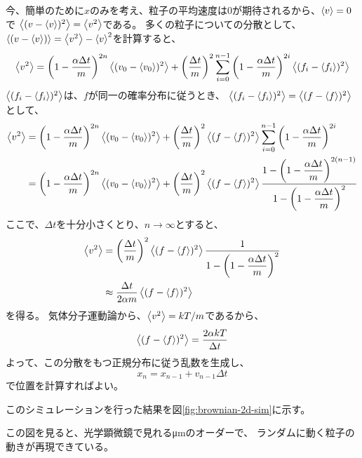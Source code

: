 今、簡単のために$x$のみを考え、粒子の平均速度は0が期待されるから、$\left< v \right> = 0$で
$\left< (v - \left< v \right>)^2 \right> = \left< v^2 \right>$である。
多くの粒子についての分散として、$\left< (v - \left< v \right>) \right> = \left< v^2 \right> - \left< v \right>^2$を計算すると、
\begin{align*}
    \left< v^2 \right> = \left(1 - \dfrac{\alpha \Delta t}{m}\right)^{2n} \left< (v_0 - \left< v_0 \right>)^2 \right> + \left(\dfrac{\Delta t}{m}\right)^2 \sum_{i=0}^{n-1} \left(1 - \dfrac{\alpha \Delta t}{m}\right)^{2i} \left< (f_i - \left< f_i \right>)^2 \right>
\end{align*}
$\left< (f_i - \left< f_i \right>)^2 \right>$は、$f$が同一の確率分布に従うとき、
$\left< (f_i - \left< f_i \right>)^2 \right> = \left< (f - \left< f \right>)^2 \right>$として、
\begin{align*}
    \left< v^2 \right> & = \left(1 - \dfrac{\alpha \Delta t}{m}\right)^{2n} \left< (v_0 - \left< v_0 \right>)^2 \right> + \left(\dfrac{\Delta t}{m}\right)^2 \left< (f - \left< f \right>)^2 \right> \sum_{i=0}^{n-1} \left(1 - \dfrac{\alpha \Delta t}{m}\right)^{2i} \nonumber                                         \\
             & = \left(1 - \dfrac{\alpha \Delta t}{m}\right)^{2n} \left< (v_0 - \left< v_0 \right>)^2 \right> + \left(\dfrac{\Delta t}{m}\right)^2 \left< (f - \left< f \right>)^2 \right> \dfrac{1 - \left(1 - \dfrac{\alpha \Delta t}{m}\right)^{2(n-1)}}{1 - \left(1 - \dfrac{\alpha \Delta t}{m}\right)^2}
\end{align*}
ここで、$\Delta t$を十分小さくとり、$n \to \infty$とすると、
\begin{align}
    \left< v^2 \right> & = \left(\dfrac{\Delta t}{m}\right)^2 \left< (f - \left< f \right>)^2 \right> \dfrac{1}{1 - \left(1 - \dfrac{\alpha \Delta t}{m}\right)^2} \nonumber \\
             & \approx \dfrac{\Delta t}{2 \alpha m} \left< (f - \left< f \right>)^2 \right>
\end{align}
を得る。
気体分子運動論から、$\left< v^2 \right> = kT/m$であるから、
\begin{equation}
    \left< (f - \left< f \right>)^2 \right> = \dfrac{2 \alpha kT}{\Delta t}
\end{equation}
よって、この分散をもつ正規分布に従う乱数を生成し、
\begin{equation}
    x_n = x_{n-1} + v_{n-1} \Delta t
\end{equation}
で位置を計算すればよい。

このシミュレーションを行った結果を図\ref{fig:brownian-2d-sim}に示す。

この図を見ると、光学顕微鏡で見れる\si{\micro\meter}のオーダーで、
ランダムに動く粒子の動きが再現できている。
